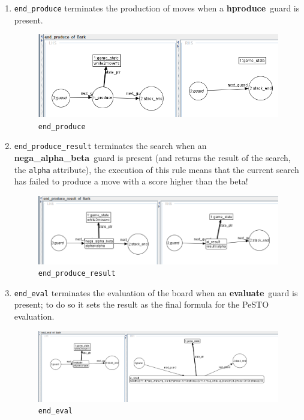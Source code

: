 \documentclass[a4paper, 10pt]{scrartcl}
\newcommand{\noderepr}[1]{\textsf{\textbf{#1}}}
\newcommand{\hproduce}{\noderepr{hproduce}}
\newcommand{\evaluate}{\noderepr{evaluate}}
\newcommand{\ai}{\noderepr{nega\_alpha\_beta}}
\begin{document}
    \begin{enumerate}
        \item \texttt{end\_produce} terminates the production of moves when a \hproduce\ guard is present.
        \begin{figure}[H]
            \centering
            \includegraphics[width=.8\linewidth]{images/end_produce.png}
            \caption{\texttt{end\_produce}}
        \end{figure} 
        \item \texttt{end\_produce\_result} terminates the search when an \ai\ guard is present (and returns the result of the search, the \texttt{alpha} attribute), the execution of this rule means that the current search has failed to produce a move with a score higher than the beta!
        \begin{figure}[H]
            \centering
            \includegraphics[width=.8\linewidth]{images/end_produce_result.png}
            \caption{\texttt{end\_produce\_result}}
        \end{figure} 
        \item \texttt{end\_eval} terminates the evaluation of the board when an \evaluate\ guard is present; to do so it sets the result as the final formula for the PeSTO evaluation.
        \begin{figure}[H]
            \centering
            \includegraphics[width=.8\linewidth]{images/end_eval.png}
            \caption{\texttt{end\_eval}}
        \end{figure} 

\end{enumerate}
\end{document}
